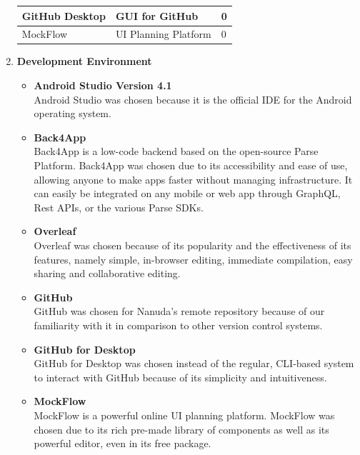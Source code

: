 \documentclass[conference]{IEEEtran}
\begin{document}
\begin{enumerate}
\begin{center}
\begin{tabular}{|p{6em}|p{10em}|p{4em}|}
                \hline
                GitHub Desktop & GUI for GitHub & 0 \\
                \hline
                MockFlow & UI Planning Platform & 0 \\
                \hline
            \end{tabular}
        \end{center}
    \item \textbf{Development Environment}
    \begin{itemize}
        \item \textbf{Android Studio Version 4.1} \\
        Android Studio was chosen because it is the official IDE for the Android operating system.
        \item \textbf{Back4App} \\
        Back4App is a low-code backend based on the open-source Parse Platform. Back4App was chosen due to its accessibility and ease of use, allowing anyone to make apps faster without managing infrastructure. It can easily be integrated on any mobile or web app through GraphQL, Rest APIs, or the various Parse SDKs.
        \item \textbf{Overleaf} \\
        Overleaf was chosen because of its popularity and the effectiveness of its features, namely simple, in-browser editing, immediate compilation, easy sharing and collaborative editing.
        \item \textbf{GitHub} \\
        GitHub was chosen for Nanuda's remote repository because of our familiarity with it in comparison to other version control systems.
        \item \textbf{GitHub for Desktop} \\
        GitHub for Desktop was chosen instead of the regular, CLI-based system to interact with GitHub because of its simplicity and intuitiveness.
        \item \textbf{MockFlow} \\
        MockFlow is a powerful online UI planning platform. MockFlow was chosen due to its rich pre-made library of components as well as its powerful editor, even in its free package.
    \end{itemize}
\end{enumerate}
\end{document}
